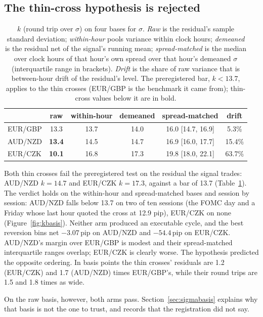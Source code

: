 \documentclass[11pt]{article}
\begin{document}
\subsection{The thin-cross hypothesis is rejected}\label{sec:thin}

\begin{table}[t]
\centering
\caption{$k$ (round trip over $\sigma$) on four bases for $\sigma$.
\emph{Raw} is the residual's sample standard deviation;
\emph{within-hour} pools variance within clock hours; \emph{demeaned}
is the residual net of the signal's running mean; \emph{spread-matched}
is the median over clock hours of that hour's own spread over that
hour's demeaned $\sigma$ (interquartile range in brackets). \emph{Drift}
is the share of raw variance that is between-hour drift of the
residual's level. The preregistered bar, $k < 13.7$, applies to the
thin crosses (EUR/GBP is the benchmark it came from); thin-cross values
below it are in bold.}
\label{tab:kbasis}
\begin{tabular}{lccccc}
\toprule
 & raw & within-hour & demeaned & spread-matched & drift \\
\midrule
EUR/GBP & 13.3 & 13.7 & 14.0 & 16.0 [14.7, 16.9] & 5.3\% \\
AUD/NZD & \textbf{13.4} & 14.5 & 14.7 & 16.9 [16.0, 17.7] & 15.4\% \\
EUR/CZK & \textbf{10.1} & 16.8 & 17.3 & 19.8 [18.0, 22.1] & 63.7\% \\
\bottomrule
\end{tabular}
\end{table}

Both thin crosses fail the preregistered test on the residual the
signal trades: AUD/NZD $k = 14.7$ and EUR/CZK $k = 17.3$, against a bar
of 13.7 (Table~\ref{tab:kbasis}). The verdict holds on the within-hour
and spread-matched bases and session by session: AUD/NZD falls below
13.7 on two of ten sessions (the FOMC day and a Friday whose last hour
quoted the cross at 12.9 pip), EUR/CZK on none (Figure~\ref{fig:kbasis}).
Neither arm produced an executable cycle, and the best reversion bins
net $-3.07$\,pip on AUD/NZD and $-54.4$\,pip on EUR/CZK. AUD/NZD's
margin over EUR/GBP is modest and their spread-matched interquartile
ranges overlap; EUR/CZK is clearly worse. The hypothesis predicted the
opposite ordering. In basis points the thin crosses' residuals are
1.2 (EUR/CZK) and 1.7 (AUD/NZD) times EUR/GBP's, while their round
trips are 1.5 and 1.8 times as wide.

On the raw basis, however, both arms pass. Section~\ref{sec:sigmabasis}
explains why that basis is not the one to trust, and records that the
registration did not say.
\end{document}
